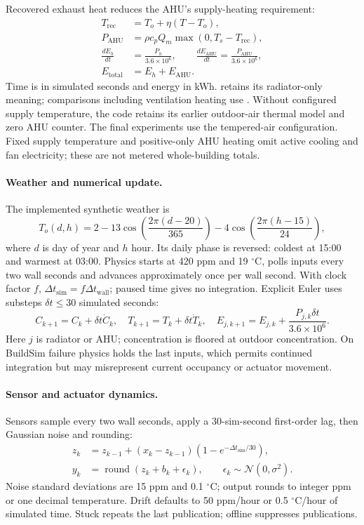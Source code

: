 \documentclass[11pt,a4paper]{article}
\begin{document}
Recovered exhaust heat reduces the AHU's supply-heating requirement:
\begin{align}
T_{\mathrm{rec}}&=T_o+\eta(T-T_o),\\
P_{\mathrm{AHU}}&=\rho c_pQ_m\max(0,T_s-T_{\mathrm{rec}}),\\
\frac{dE_h}{dt}&=\frac{P_h}{3.6\times10^6},\qquad
\frac{dE_{\mathrm{AHU}}}{dt}=\frac{P_{\mathrm{AHU}}}{3.6\times10^6},\\
E_{\mathrm{total}}&=E_h+E_{\mathrm{AHU}}.
\end{align}
Time is in simulated seconds and energy in kWh. \protect{} retains its radiator-only meaning; comparisons including ventilation heating use \protect{}. Without configured supply temperature, the code retains its earlier outdoor-air thermal model and zero AHU counter. The final experiments use the tempered-air configuration. Fixed supply temperature and positive-only AHU heating omit active cooling and fan electricity; these are not metered whole-building totals.

\paragraph{Weather and numerical update.}
The implemented synthetic weather is
\begin{equation}
T_o(d,h)=2-13\cos\!\left(\frac{2\pi(d-20)}{365}\right)
-4\cos\!\left(\frac{2\pi(h-15)}{24}\right),
\end{equation}
where $d$ is day of year and $h$ hour. Its daily phase is reversed: coldest at 15:00 and warmest at 03:00. Physics starts at 420 ppm and 19 $^\circ$C, polls inputs every two wall seconds and advances approximately once per wall second. With clock factor $f$, $\Delta t_{\mathrm{sim}}=f\Delta t_{\mathrm{wall}}$; paused time gives no integration. Explicit Euler uses substeps $\delta t\leq30$ simulated seconds:
\begin{equation}
C_{k+1}=C_k+\delta t\dot C_k,\quad T_{k+1}=T_k+\delta t\dot T_k,\quad
E_{j,k+1}=E_{j,k}+\frac{P_{j,k}\delta t}{3.6\times10^6}.
\end{equation}
Here $j$ is radiator or AHU; concentration is floored at outdoor concentration. On BuildSim failure physics holds the last inputs, which permits continued integration but may misrepresent current occupancy or actuator movement.

\paragraph{Sensor and actuator dynamics.}
Sensors sample every two wall seconds, apply a 30-sim-second first-order lag, then Gaussian noise and rounding:
\begin{align}
z_k&=z_{k-1}+(x_k-z_{k-1})(1-e^{-\Delta t_{\mathrm{sim}}/30}),\\
y_k&=\operatorname{round}(z_k+b_k+\epsilon_k),\qquad
\epsilon_k\sim\mathcal N(0,\sigma^2).
\end{align}
Noise standard deviations are 15 ppm and 0.1 $^\circ$C; output rounds to integer ppm or one decimal temperature. Drift defaults to 50 ppm/hour or 0.5 $^\circ$C/hour of simulated time. Stuck repeats the last publication; offline suppresses publications.
\end{document}
